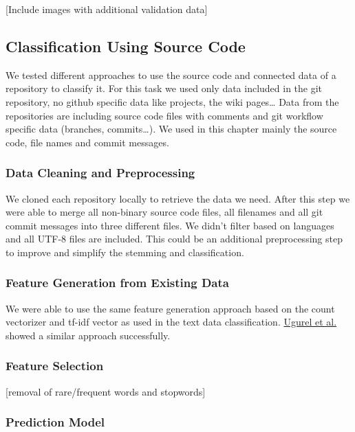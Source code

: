 \documentclass{article}
\begin{document}
{[}Include images with additional validation data{]}

\subsection{Classification Using Source
Code}\label{classification-using-source-code}

We tested different approaches to use the source code and connected data
of a repository to classify it. For this task we used only data included
in the git repository, no github specific data like projects, the wiki
pages\ldots{} Data from the repositories are including source code files
with comments and git workflow specific data (branches,
commits\ldots{}). We used in this chapter mainly the source code, file
names and commit messages.

\subsubsection{Data Cleaning and
Preprocessing}\label{data-cleaning-and-preprocessing-2}

We cloned each repository locally to retrieve the data we need. After
this step we were able to merge all non-binary source code files, all
filenames and all git commit messages into three different files. We
didn't filter based on languages and all UTF-8 files are included. This
could be an additional preprocessing step to improve and simplify the
stemming and classification.

\subsubsection{Feature Generation from Existing
Data}\label{feature-generation-from-existing-data-1}

We were able to use the same feature generation approach based on the
count vectorizer and tf-idf vector as used in the text data
classification.
\href{https://clgiles.ist.psu.edu/papers/KDD-2002-whatsthecode.pdf}{Ugurel
et al.} showed a similar approach successfully.

\subsubsection{Feature Selection}\label{feature-selection-2}

{[}removal of rare/frequent words and stopwords{]}

\subsubsection{Prediction Model}\label{prediction-model-2}
\end{document}
